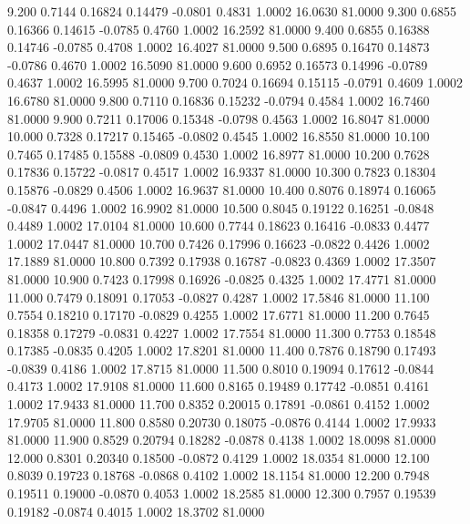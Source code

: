    9.200   0.7144   0.16824   0.14479  -0.0801   0.4831   1.0002  16.0630  81.0000
   9.300   0.6855   0.16366   0.14615  -0.0785   0.4760   1.0002  16.2592  81.0000
   9.400   0.6855   0.16388   0.14746  -0.0785   0.4708   1.0002  16.4027  81.0000
   9.500   0.6895   0.16470   0.14873  -0.0786   0.4670   1.0002  16.5090  81.0000
   9.600   0.6952   0.16573   0.14996  -0.0789   0.4637   1.0002  16.5995  81.0000
   9.700   0.7024   0.16694   0.15115  -0.0791   0.4609   1.0002  16.6780  81.0000
   9.800   0.7110   0.16836   0.15232  -0.0794   0.4584   1.0002  16.7460  81.0000
   9.900   0.7211   0.17006   0.15348  -0.0798   0.4563   1.0002  16.8047  81.0000
  10.000   0.7328   0.17217   0.15465  -0.0802   0.4545   1.0002  16.8550  81.0000
  10.100   0.7465   0.17485   0.15588  -0.0809   0.4530   1.0002  16.8977  81.0000
  10.200   0.7628   0.17836   0.15722  -0.0817   0.4517   1.0002  16.9337  81.0000
  10.300   0.7823   0.18304   0.15876  -0.0829   0.4506   1.0002  16.9637  81.0000
  10.400   0.8076   0.18974   0.16065  -0.0847   0.4496   1.0002  16.9902  81.0000
  10.500   0.8045   0.19122   0.16251  -0.0848   0.4489   1.0002  17.0104  81.0000
  10.600   0.7744   0.18623   0.16416  -0.0833   0.4477   1.0002  17.0447  81.0000
  10.700   0.7426   0.17996   0.16623  -0.0822   0.4426   1.0002  17.1889  81.0000
  10.800   0.7392   0.17938   0.16787  -0.0823   0.4369   1.0002  17.3507  81.0000
  10.900   0.7423   0.17998   0.16926  -0.0825   0.4325   1.0002  17.4771  81.0000
  11.000   0.7479   0.18091   0.17053  -0.0827   0.4287   1.0002  17.5846  81.0000
  11.100   0.7554   0.18210   0.17170  -0.0829   0.4255   1.0002  17.6771  81.0000
  11.200   0.7645   0.18358   0.17279  -0.0831   0.4227   1.0002  17.7554  81.0000
  11.300   0.7753   0.18548   0.17385  -0.0835   0.4205   1.0002  17.8201  81.0000
  11.400   0.7876   0.18790   0.17493  -0.0839   0.4186   1.0002  17.8715  81.0000
  11.500   0.8010   0.19094   0.17612  -0.0844   0.4173   1.0002  17.9108  81.0000
  11.600   0.8165   0.19489   0.17742  -0.0851   0.4161   1.0002  17.9433  81.0000
  11.700   0.8352   0.20015   0.17891  -0.0861   0.4152   1.0002  17.9705  81.0000
  11.800   0.8580   0.20730   0.18075  -0.0876   0.4144   1.0002  17.9933  81.0000
  11.900   0.8529   0.20794   0.18282  -0.0878   0.4138   1.0002  18.0098  81.0000
  12.000   0.8301   0.20340   0.18500  -0.0872   0.4129   1.0002  18.0354  81.0000
  12.100   0.8039   0.19723   0.18768  -0.0868   0.4102   1.0002  18.1154  81.0000
  12.200   0.7948   0.19511   0.19000  -0.0870   0.4053   1.0002  18.2585  81.0000
  12.300   0.7957   0.19539   0.19182  -0.0874   0.4015   1.0002  18.3702  81.0000
